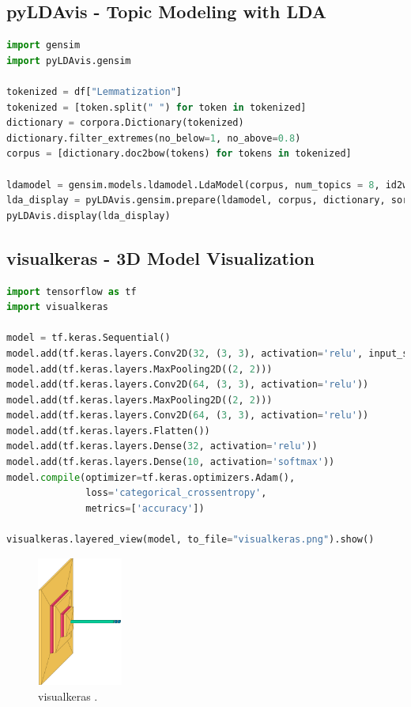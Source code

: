 \subsection{pyLDAvis - Topic Modeling with LDA}
\begin{lstlisting}[language=Python]
import gensim
import pyLDAvis.gensim

tokenized = df["Lemmatization"]
tokenized = [token.split(" ") for token in tokenized]
dictionary = corpora.Dictionary(tokenized)
dictionary.filter_extremes(no_below=1, no_above=0.8)
corpus = [dictionary.doc2bow(tokens) for tokens in tokenized]

ldamodel = gensim.models.ldamodel.LdaModel(corpus, num_topics = 8, id2word=dictionary, passes=15)
lda_display = pyLDAvis.gensim.prepare(ldamodel, corpus, dictionary, sort_topics=True)
pyLDAvis.display(lda_display)
\end{lstlisting}

\subsection{visualkeras - 3D Model Visualization}
\begin{lstlisting}[language=Python]
import tensorflow as tf
import visualkeras

model = tf.keras.Sequential()
model.add(tf.keras.layers.Conv2D(32, (3, 3), activation='relu', input_shape=(224, 224, 3)))
model.add(tf.keras.layers.MaxPooling2D((2, 2)))
model.add(tf.keras.layers.Conv2D(64, (3, 3), activation='relu'))
model.add(tf.keras.layers.MaxPooling2D((2, 2)))
model.add(tf.keras.layers.Conv2D(64, (3, 3), activation='relu'))
model.add(tf.keras.layers.Flatten())
model.add(tf.keras.layers.Dense(32, activation='relu'))
model.add(tf.keras.layers.Dense(10, activation='softmax'))
model.compile(optimizer=tf.keras.optimizers.Adam(),
              loss='categorical_crossentropy',
              metrics=['accuracy'])

visualkeras.layered_view(model, to_file="visualkeras.png").show()
\end{lstlisting}

\begin{figure}[ht]
    \centering
    \includegraphics[width=0.25\textwidth]{images/visualkeras.png}
    \caption{visualkeras .}
    \label{fig:enter-label}
\end{figure}

